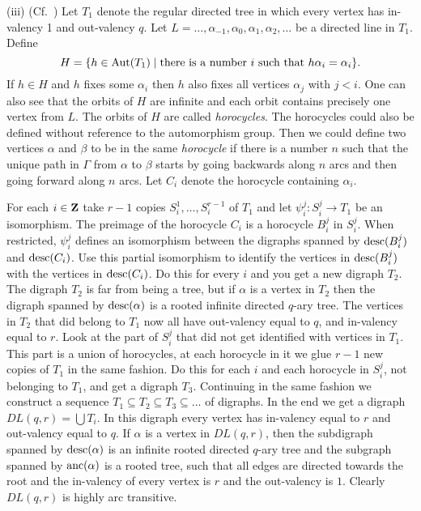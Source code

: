 \documentclass{emsprocart}
\theoremstyle{definition}
\begin{document}
(iii)  (Cf.~\cite[Example 1]{Moller2002})
Let $T_1$ denote the regular directed tree in which every
vertex has in-valency 1 and out-valency $q$.  Let $L=\ldots,
\alpha_{-1},\alpha_0,\alpha_1,\alpha_2,\ldots$ be a directed line in $T_1$.
Define
$$H=\{h\in{\mbox{${\rm Aut}$}}(T_1)\mid \mbox{there is a number }i \mbox{ such that }
h\alpha_i=\alpha_i\}.$$  If $h\in H$ and $h$ fixes some $\alpha_i$ then $h$
also fixes all vertices $\alpha_j$ with $j<i$.  One can also see that the
orbits of $H$ are infinite and each orbit contains precisely one vertex
from $L$.  The orbits of $H$ are called {\em horocycles}.  The
horocycles could also be defined without reference to
the automorphism group.  Then we could define two vertices $\alpha$ and
$\beta$ to be in the same {\em horocycle} if there is a number $n$
such that the unique path in $\Gamma$ from $\alpha$ to $\beta$
starts by going backwards along
$n$ arcs and then going forward along $n$ arcs.
Let $C_i$
denote the horocycle containing $\alpha_i$.

For each $i\in{\mbox{\bf Z}}$ take $r-1$ copies $S^1_i, \ldots, S^{r-1}_i$ of $T_1$
and let $\psi^j_i:S^j_i\rightarrow T_1$ be an isomorphism.   The preimage
of the horocycle $C_i$ is a horocycle $B^j_i$ in $S^j_i$.  When restricted,
$\psi^j_i$ defines an isomorphism between the digraphs spanned by
${\mbox{${\rm desc}$}}(B^j_i)$ and ${\mbox{${\rm desc}$}}(C_i)$.  Use
this partial isomorphism to identify the vertices in ${\mbox{${\rm desc}$}}(B^j_i)$ with the vertices in
 ${\mbox{${\rm desc}$}}(C_i)$.
 Do this for every $i$ and you get a new digraph $T_2$.  The
 digraph $T_2$ is far from being a tree, but if  $\alpha$ is a vertex in
 $T_2$ then the digraph spanned by
 ${\mbox{${\rm desc}$}}(\alpha)$ is a rooted infinite directed $q$-ary tree.  The
 vertices in $T_2$ that did belong to $T_1$ now all have out-valency
 equal to $q$,
 and in-valency equal to $r$.
 Look at the part of $S^j_i$ that did not get identified with vertices
 in $T_1$.  This part is a union of horocycles, at each horocycle in it we
 glue $r-1$ new copies of $T_1$ in the same fashion.  Do this for each $i$   and
 each horocycle in $S^j_i$, not belonging to $T_1$, and
 get a digraph $T_3$.  Continuing in the same fashion we construct a
 sequence $T_1\subseteq T_2\subseteq T_3\subseteq\ldots$ of digraphs.  In
 the end we get a digraph $DL(q,r)=\bigcup T_i$.  In this digraph every
 vertex has
 in-valency equal to $r$ and out-valency equal to $q$.
If $\alpha$ is a vertex in
$DL(q,r)$, then the subdigraph spanned by ${\mbox{${\rm desc}$}}(\alpha)$
 is an infinite rooted directed $q$-ary tree and the subgraph spanned
 by ${\mbox{${\rm anc}$}}(\alpha)$ is a rooted tree, such that all edges are directed
 towards the root and the in-valency of every vertex is $r$ and the
 out-valency is $1$.
 Clearly $DL(q,r)$ is highly arc transitive.
\end{document}
